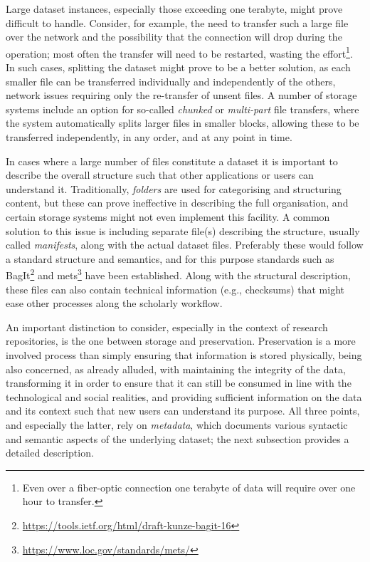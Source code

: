 Large dataset instances, especially those exceeding one terabyte, might prove difficult to handle. Consider, for example, the need to transfer such a large file over the network and the possibility that the connection will drop during the operation; most often the transfer will need to be restarted, wasting the effort\footnote{Even over a fiber-optic connection one terabyte of data will require over one hour to transfer.}. In such cases, splitting the dataset might prove to be a better solution, as each smaller file can be transferred individually and independently of the others, network issues requiring only the re-transfer of unsent files. A number of storage systems include an option for so-called \emph{chunked} or \emph{multi-part} file transfers, where the system automatically splits larger files in smaller blocks, allowing these to be transferred independently, in any order, and at any point in time.

In cases where a large number of files constitute a dataset it is important to describe the overall structure such that other applications or users can understand it. Traditionally, \emph{folders} are used for categorising and structuring content, but these can prove ineffective in describing the full organisation, and certain storage systems might not even implement this facility. A common solution to this issue is including separate file(s) describing the structure, usually called \emph{manifests}, along with the actual dataset files. Preferably these would follow a standard structure and semantics, and for this purpose standards such as BagIt\footnote{\url{https://tools.ietf.org/html/draft-kunze-bagit-16}} and \gls{mets}\footnote{\url{https://www.loc.gov/standards/mets/}} have been established. Along with the structural description, these files can also contain technical information (e.g., checksums) that might ease other processes along the scholarly workflow.

An important distinction to consider, especially in the context of research repositories, is the one between storage and preservation. Preservation is a more involved process than simply ensuring that information is stored physically, being also concerned, as already alluded, with maintaining the integrity of the data, transforming it in order to ensure that it can still be consumed in line with the technological and social realities, and providing sufficient information on the data and its context such that new users can understand its purpose. All three points, and especially the latter, rely on \emph{metadata}, which documents various syntactic and semantic aspects of the underlying dataset; the next subsection provides a detailed description.


